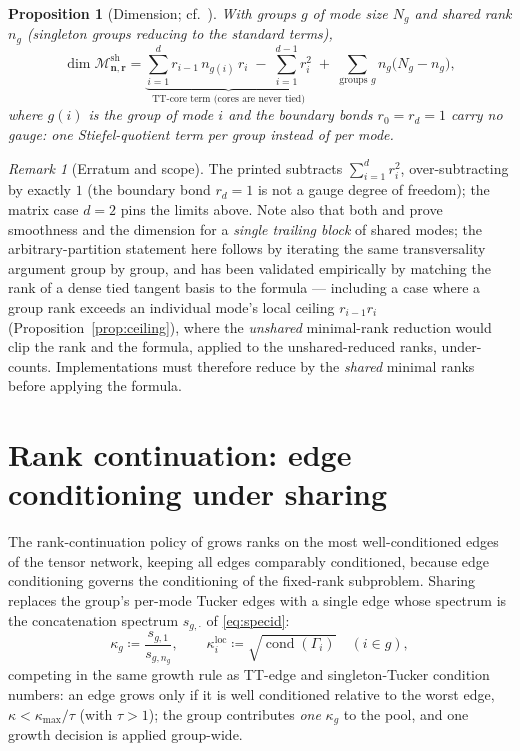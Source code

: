 \documentclass[11pt]{article}
\newtheorem{proposition}[theorem]{Proposition}
\theoremstyle{definition}
\theoremstyle{remark}
\newtheorem{remark}[theorem]{Remark}
\newcommand{\cond}{\operatorname{cond}}
\newcommand{\Msh}{\mathcal{M}^{\mathrm{sh}}_{\boldsymbol{n},\boldsymbol{r}}}
\begin{document}
\begin{proposition}[Dimension; cf.~{\cite[Thm.~5]{MR2026}}]\label{prop:dim}
With groups $g$ of mode size $N_g$ and shared rank $n_g$ (singleton groups
reducing to the standard terms),
\[
\dim \Msh
= \underbrace{\sum_{i=1}^{d} r_{i-1}\, n_{g(i)}\, r_i
  \;-\; \sum_{i=1}^{d-1} r_i^2}_{\text{TT-core term (cores are never tied)}}
\;+\; \sum_{\text{groups } g} n_g \bigl( N_g - n_g \bigr),
\]
where $g(i)$ is the group of mode $i$ and the boundary bonds
$r_0 = r_d = 1$ carry no gauge: one Stiefel-quotient term per \emph{group}
instead of per mode.
\end{proposition}

\begin{remark}[Erratum and scope]
The printed \cite[Thm.~5]{MR2026} subtracts $\sum_{i=1}^{d} r_i^2$,
over-subtracting by exactly $1$ (the boundary bond $r_d = 1$ is not a gauge
degree of freedom); the matrix case $d = 2$ pins the limits above. Note also
that both \cite{MR2026} and \cite{Pesh2024} prove smoothness and the
dimension for a \emph{single trailing block} of shared modes; the
arbitrary-partition statement here follows by iterating the same
transversality argument group by group, and has been validated empirically by
matching the rank of a dense tied tangent basis to the formula --- including
a case where a group rank exceeds an individual mode's local ceiling
$r_{i-1} r_i$ (Proposition~\ref{prop:ceiling}), where the \emph{unshared}
minimal-rank reduction would clip the rank and the formula, applied to the
unshared-reduced ranks, under-counts. Implementations must therefore reduce
by the \emph{shared} minimal ranks before applying the formula.
\end{remark}

\section{Rank continuation: edge conditioning under sharing}\label{sec:cont}

The rank-continuation policy of \cite{T4S} grows ranks on the most
well-conditioned edges of the tensor network, keeping all edges comparably
conditioned, because edge conditioning governs the conditioning of the
fixed-rank subproblem. Sharing replaces the group's per-mode Tucker edges
with a single edge whose spectrum is the concatenation spectrum
$s_{g,\cdot}$ of \eqref{eq:specid}:
\[
\kappa_g \coloneqq \frac{s_{g,1}}{s_{g,n_g}},
\qquad
\kappa^{\mathrm{loc}}_i \coloneqq \sqrt{\cond(\Gamma_i)}
\quad (i \in g),
\]
competing in the same growth rule as TT-edge and singleton-Tucker condition
numbers: an edge grows only if it is well conditioned relative to the worst
edge, $\kappa < \kappa_{\max}/\tau$ (with $\tau > 1$); the group contributes
\emph{one} $\kappa_g$ to the pool, and one growth decision is applied
group-wide.
\end{document}
